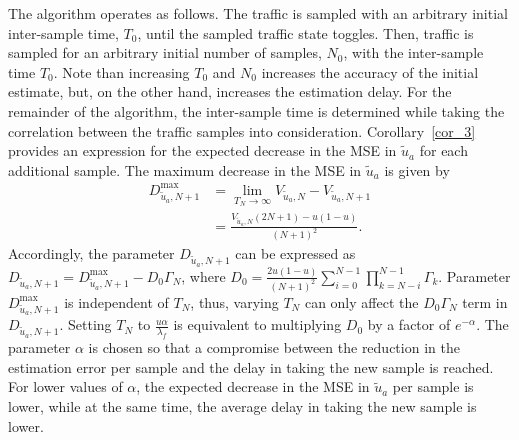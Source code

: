 \documentclass[11pt,draftclsnofoot,journal,onecolumn]{IEEEtran}
\begin{document}
The algorithm operates as follows. The traffic is sampled with an arbitrary initial inter-sample time, $T_0$, until the sampled traffic state toggles. Then, traffic is sampled for an arbitrary initial number of samples, $N_0$, with the inter-sample time $T_0$. Note than increasing $T_0$ and $N_0$ increases the accuracy of the initial estimate, but, on the other hand, increases the estimation delay. For the remainder of the algorithm, the inter-sample time is determined while taking the correlation between the traffic samples into consideration. Corollary~\ref{cor_3} provides an expression for the expected decrease in the MSE in $\tilde{u}_a$ for each additional sample. The maximum decrease in the MSE in $\tilde{u}_a$ is given by
\begin{align}
D_{\tilde{u}_a,N+1}^{\max} & = \lim_{T_N\to\infty} V_{\tilde{u}_a,N} - V_{\tilde{u}_a,N+1}\nonumber\\& = \frac{V_{\tilde{u}_a,N}(2N+1)-u(1-u)}{(N+1)^2}.
\end{align}
Accordingly, the parameter $D_{\tilde{u}_a,N+1}$ can be expressed as $D_{\tilde{u}_a,N+1} = D_{\tilde{u}_a,N+1}^{\max} - D_0 \Gamma_N$, where $D_0 = \frac{2u(1-u)}{(N+1)^2}\sum_{i=0}^{N-1} \prod_{k=N-i}^{N-1} \Gamma_k$. Parameter $D_{\tilde{u}_a,N+1}^{\max}$ is independent of $T_N$, thus, varying $T_N$ can only affect the $D_0 \Gamma_N$ term in $D_{\tilde{u}_a,N+1}$. Setting $T_N$ to $\frac{u\alpha}{\lambda_f}$ is equivalent to multiplying $D_0$ by a factor of $e^{-\alpha}$. The parameter $\alpha$ is chosen so that a compromise between the reduction in the estimation error per sample and the delay in taking the new sample is reached. For lower values of $\alpha$, the expected decrease in the MSE in $\tilde{u}_a$ per sample is lower, while at the same time, the average delay in taking the new sample is lower.
\end{document}
